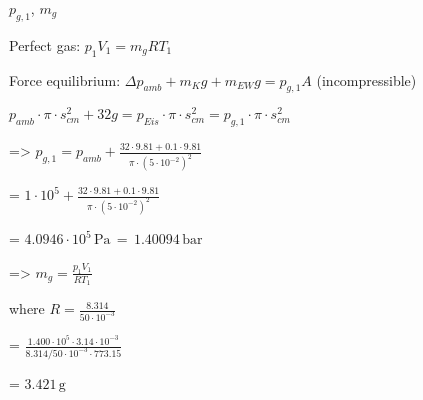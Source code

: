 \( p_{g,1} \), \( m_g \)  

Perfect gas:  
\( p_1 V_1 = m_g R T_1 \)  

Force equilibrium:  
\( \Delta p_{amb} + m_K g + m_{EW} g = p_{g,1} A \) (incompressible)  

\( p_{amb} \cdot \pi \cdot s_{cm}^2 + 32 g = p_{Eis} \cdot \pi \cdot s_{cm}^2 = p_{g,1} \cdot \pi \cdot s_{cm}^2 \)  

=> \( p_{g,1} = p_{amb} + \frac{32 \cdot 9.81 + 0.1 \cdot 9.81}{\pi \cdot (5 \cdot 10^{-2})^2} \)  

= \( 1 \cdot 10^5 + \frac{32 \cdot 9.81 + 0.1 \cdot 9.81}{\pi \cdot (5 \cdot 10^{-2})^2} \)  

= \( 4.0946 \cdot 10^5 \, \text{Pa} \, = \, 1.40094 \, \text{bar} \)  

=> \( m_g = \frac{p_1 V_1}{R T_1} \)  

where \( R = \frac{8.314}{50 \cdot 10^{-3}} \)  

= \( \frac{1.400 \cdot 10^5 \cdot 3.14 \cdot 10^{-3}}{8.314 / 50 \cdot 10^{-3} \cdot 773.15} \)  

= \( 3.421 \, \text{g} \)
